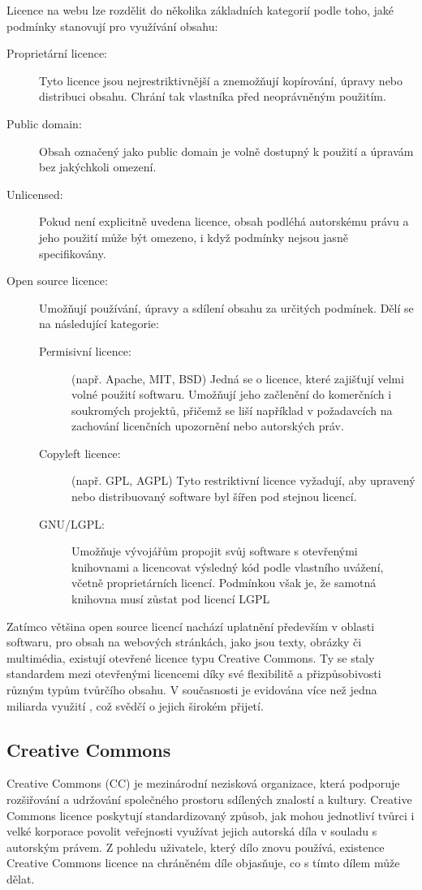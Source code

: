 Licence na webu lze rozdělit do několika základních kategorií podle toho, jaké podmínky stanovují pro využívání obsahu: 
\begin{description}
    \item[Proprietární licence:] Tyto licence jsou nejrestriktivnější a znemožňují kopírování, úpravy nebo distribuci obsahu. Chrání tak vlastníka před neoprávněným použitím.
    \item[Public domain:] Obsah označený jako public domain je volně dostupný k použití a úpravám bez jakýchkoli omezení.
    \item[Unlicensed:] Pokud není explicitně uvedena licence, obsah podléhá autorskému právu a jeho použití může být omezeno, i když podmínky nejsou jasně specifikovány.
    \item[Open source licence:] Umožňují používání, úpravy a sdílení obsahu za určitých podmínek. Dělí se na následující kategorie:
        \begin{description}
            \item[Permisivní licence:] (např. Apache, MIT, BSD) Jedná se o licence, které zajišťují velmi volné použití softwaru. Umožňují jeho začlenění do komerčních i soukromých projektů, přičemž se liší například v požadavcích na zachování licenčních upozornění nebo autorských práv.
            \item[Copyleft licence:] (např. GPL, AGPL) Tyto restriktivní licence vyžadují, aby upravený nebo distribuovaný software byl šířen pod stejnou licencí.
            \item[GNU/LGPL:] Umožňuje vývojářům propojit svůj software s otevřenými knihovnami a licencovat výsledný kód podle vlastního uvážení, včetně proprietárních licencí. Podmínkou však je, že samotná knihovna musí zůstat pod licencí LGPL  \cite{snykOpenSource}
        \end{description}
\end{description} 

Zatímco většina open source licencí nachází uplatnění především v oblasti softwaru, pro obsah na webových stránkách, jako jsou texty, obrázky či multimédia, existují otevřené licence typu Creative Commons.
Ty se staly standardem mezi otevřenými licencemi díky své flexibilitě a přizpůsobivosti různým typům tvůrčího obsahu.
V současnosti je evidována více než jedna miliarda využití \cite{libguidesGuidesUsing}, což svědčí o jejich širokém přijetí.

\subsection{Creative Commons}
Creative Commons (CC) je mezinárodní nezisková organizace, která podporuje rozšiřování a udržování společného prostoru sdílených znalostí a kultury. 
Creative Commons licence poskytují standardizovaný způsob, jak mohou jednotliví tvůrci i velké korporace povolit veřejnosti využívat jejich autorská díla v souladu s autorským právem.
Z pohledu uživatele, který dílo znovu používá, existence Creative Commons licence na chráněném díle objasňuje, co s tímto dílem může dělat. \cite{creativecommonsAboutLicenses}

